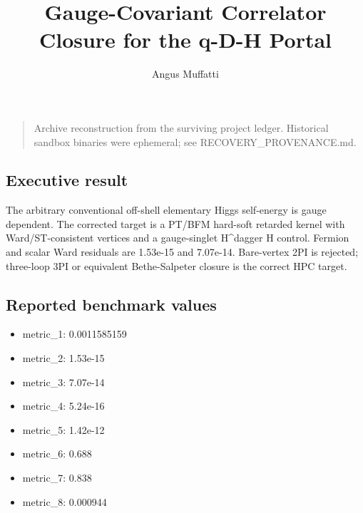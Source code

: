 \documentclass[
]{article}
\title{Gauge-Covariant Correlator Closure for the q-D-H Portal}
\author{Angus Muffatti}
\date{}
\providecommand{\tightlist}{%
  \setlength{\itemsep}{0pt}\setlength{\parskip}{0pt}}
\begin{document}
\maketitle

\begin{quote}
Archive reconstruction from the surviving project ledger. Historical
sandbox binaries were ephemeral; see RECOVERY\_PROVENANCE.md.
\end{quote}

\hypertarget{executive-result}{%
\subsection{Executive result}\label{executive-result}}

The arbitrary conventional off-shell elementary Higgs self-energy is
gauge dependent. The corrected target is a PT/BFM hard-soft retarded
kernel with Ward/ST-consistent vertices and a gauge-singlet H\^{}dagger
H control. Fermion and scalar Ward residuals are 1.53e-15 and 7.07e-14.
Bare-vertex 2PI is rejected; three-loop 3PI or equivalent Bethe-Salpeter
closure is the correct HPC target.

\hypertarget{reported-benchmark-values}{%
\subsection{Reported benchmark values}\label{reported-benchmark-values}}

\begin{itemize}
\tightlist
\item
  metric\_1: 0.0011585159
\item
  metric\_2: 1.53e-15
\item
  metric\_3: 7.07e-14
\item
  metric\_4: 5.24e-16
\item
  metric\_5: 1.42e-12
\item
  metric\_6: 0.688
\item
  metric\_7: 0.838
\item
  metric\_8: 0.000944
\end{itemize}
\end{document}
